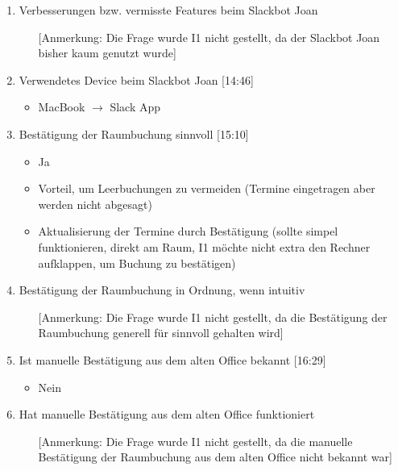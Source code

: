 \begin{enumerate}
    \item Verbesserungen bzw. vermisste Features beim Slackbot Joan
    \begin{itemize}
        \item[] [Anmerkung: Die Frage wurde I1 nicht gestellt, da der Slackbot Joan bisher kaum genutzt wurde]
    \end{itemize}
    
    \item Verwendetes Device beim Slackbot Joan [14:46]
    \begin{itemize}
        \item MacBook $\rightarrow$ Slack App
    \end{itemize}
    
    \item Bestätigung der Raumbuchung sinnvoll [15:10]
    \begin{itemize}
        \item Ja
        \item Vorteil, um Leerbuchungen zu vermeiden (Termine eingetragen aber werden nicht abgesagt)
        \item Aktualisierung der Termine durch Bestätigung (sollte simpel funktionieren, direkt am Raum, I1 möchte nicht extra den Rechner aufklappen, um Buchung zu bestätigen)
    \end{itemize}
    
    \item Bestätigung der Raumbuchung in Ordnung, wenn intuitiv
    \begin{itemize}
        \item[] [Anmerkung: Die Frage wurde I1 nicht gestellt, da die Bestätigung der Raumbuchung generell für sinnvoll gehalten wird]
    \end{itemize}
    
    \item Ist manuelle Bestätigung aus dem alten Office bekannt [16:29]
    \begin{itemize}
        \item Nein
    \end{itemize}
    
    \item Hat manuelle Bestätigung aus dem alten Office funktioniert
    \begin{itemize}
        \item[] [Anmerkung: Die Frage wurde I1 nicht gestellt, da die manuelle Bestätigung der Raumbuchung aus dem alten Office nicht bekannt war]
    \end{itemize}

\end{enumerate}

